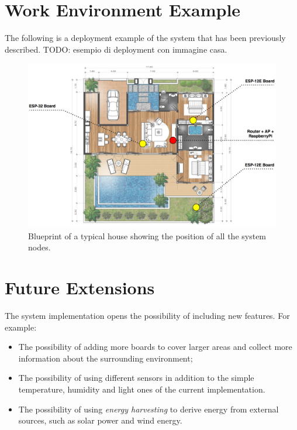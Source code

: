 \section{Work Environment Example}
The following is a deployment example of the system that has been previously described.
TODO: esempio di deployment con immagine casa.

\begin{figure}[H]
	\begin{center}
		\includegraphics[width=\textwidth]{./pictures/blueprint_deployment.png}
		\caption{Blueprint of a typical house showing the position of all the system nodes.}
		\label{blueprint_deployment}
	\end{center}
\end{figure}

\section{Future Extensions}
The system implementation opens the possibility of including new features. For example:

\begin{itemize}
	\item The possibility of adding more boards to cover larger areas and collect more information about the surrounding environment;
	\item The possibility of using different sensors in addition to the simple temperature, humidity and light ones of the current implementation.
	\item The possibility of using \textit{energy harvesting} to derive energy from external sources, such as solar power and wind energy.
\end{itemize}